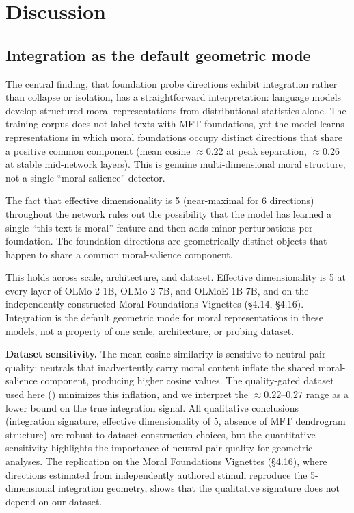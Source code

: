 \section{Discussion}\label{discussion}

\subsection{Integration as the default geometric mode}\label{integration-as-the-default-geometric-mode}

The central finding, that foundation probe directions exhibit
integration rather than collapse or isolation, has a
straightforward interpretation: language models develop structured
moral representations from distributional statistics alone. The
training corpus does not label texts with MFT foundations, yet the
model learns representations in which moral foundations occupy
distinct directions that share a positive common component (mean
cosine \(\approx 0.22\) at peak separation, \(\approx 0.26\) at stable
mid-network layers). This is genuine multi-dimensional moral
structure, not a single ``moral salience'' detector.

The fact that effective dimensionality is 5 (near-maximal for 6
directions) throughout the network rules out the possibility that
the model has learned a single ``this text is moral'' feature and
then adds minor perturbations per foundation. The foundation
directions are geometrically distinct objects that happen to share
a common moral-salience component.

This holds across scale, architecture, and dataset. Effective
dimensionality is 5 at every layer of OLMo-2 1B, OLMo-2 7B, and
OLMoE-1B-7B, and on the independently constructed Moral Foundations
Vignettes (\S4.14, \S4.16). Integration is the default geometric mode
for moral representations in these models, not a property of one
scale, architecture, or probing dataset.

\textbf{Dataset sensitivity.} The mean cosine similarity is sensitive to
neutral-pair quality: neutrals that inadvertently carry moral content
inflate the shared moral-salience component, producing higher cosine
values. The quality-gated dataset used here () minimizes this
inflation, and we interpret the \({\approx}0.22\)--\(0.27\) range as a lower
bound on the true integration signal. All qualitative conclusions
(integration signature, effective dimensionality of 5, absence of MFT
dendrogram structure) are robust to dataset construction choices,
but the quantitative sensitivity highlights the importance of
neutral-pair quality for geometric analyses. The replication on the
Moral Foundations Vignettes (\S4.16), where directions estimated from
independently authored stimuli reproduce the 5-dimensional integration
geometry, shows that the qualitative signature does not depend on our
dataset.

